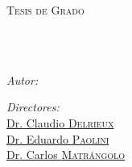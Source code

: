 \documentclass[
11pt, %
english, %
singlespacing, %
headsepline, %
]{MastersDoctoralThesis} %
\author{Luciano \textsc{Bruna}} %
\begin{document}
\frontmatter %

\pagestyle{plain} %


\begin{titlepage}
\begin{center}

\vspace*{.06\textheight}
{\scshape\LARGE \univname\par}\vspace{1.5cm} %
\textsc{\Large Tesis de Grado}\\[0.5cm] %

\HRule \\[0.4cm] %
{\huge \bfseries \ttitle\par}\vspace{0.4cm} %
\HRule \\[1.5cm] %
 
\begin{minipage}[t]{0.4\textwidth}
\begin{flushleft} \large
\emph{Autor:}\\
\href{http://www.linkedin.com/in/lucianobruna}{\authorname} %
\end{flushleft}
\end{minipage}
\begin{minipage}[t]{0.4\textwidth}
\begin{flushright} \large
\emph{Directores:} \\
\href{https://www.linkedin.com/in/claudio-delrieux-3308091}{Dr. Claudio \textsc{Delrieux}}\\
\href{https://www.linkedin.com/in/eduardo-paolini-9768536}{Dr. Eduardo \textsc{Paolini}}\\
\href{https://www.linkedin.com/in/carlos-matrangolo-16991a51/}{Dr. Carlos \textsc{Matrángolo}}
\end{flushright}
\end{minipage}\\[3cm]
 

\end{center}
\end{titlepage}
\end{document}
